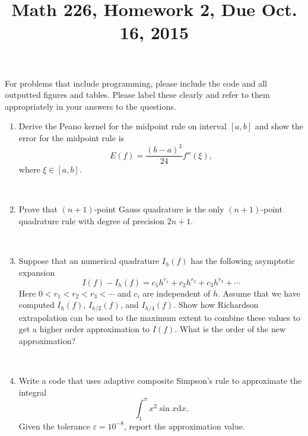 \documentclass[12pt]{amsart}
\numberwithin{equation}{section}
\numberwithin{table}{section}
\numberwithin{figure}{section}
\numberwithin{algorithm}{section}
\begin{document}
\title[]{Math 226, Homework 2, Due Oct. 16, 2015}

\maketitle


For problems that include programming, please include the code and all outputted figures and tables.  Please label these clearly and refer to them appropriately in your answers to the questions.

\begin{enumerate}

\item Derive the Peano kernel for the midpoint rule on interval $[a,b]$ and show the error for the midpoint rule is
$$
E(f) = \frac{(b-a)^3}{24} f''(\xi), 
$$
where $\xi \in [a,b]$.

\

\item Prove that $(n+1)$-point Gauss quadrature is the only $(n+1)$-point quadrature rule with degree of precision $2n+1$. 

\

\item Suppose that an numerical quadrature $I_h(f)$ has the following asymptotic expansion
$$
I(f) - I_h(f) = c_1 h^{r_1} + c_2 h^{r_2} + c_3 h^{r_3} + \cdots
$$
Here $0<r_1<r_2 < r_3 < \cdots$ and $c_i$ are independent of $h$.  Assume that we have computed $I_h(f)$, $I_{h/2}(f)$, and $I_{h/4}(f)$.  Show how Richardson extrapolation can be used to the maximum extent to combine these values to get a higher order approximation to $I(f)$.  What is the order of the new approximation?

\

\item Write a code that uses adaptive composite Simpson's rule to approximate the integral 
  \begin{equation*}
    \int_1^{\pi} x^2 \sin x \mathrm{d}x.
  \end{equation*}
 Given the tolerance $\varepsilon = 10^{-8}$, report the approximation value.
\end{enumerate}
\end{document}
